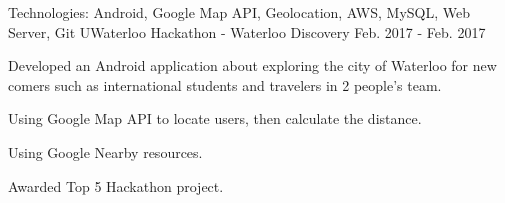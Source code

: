 \begin{cventries}
  \cventry
    {Technologies: \quad Android, Google Map API, Geolocation, AWS, MySQL, Web Server, Git}
    {UWaterloo Hackathon - Waterloo Discovery}
    {}
    {Feb. 2017 - Feb. 2017}
    {
      \begin{cvitems}
        \item {Developed an Android application about exploring the city of Waterloo for new comers such as international students and travelers in 2 people's team.}
        \item {Using Google Map API to locate users, then calculate the distance.}
        \item {Using Google Nearby resources.}
        \item {Awarded Top 5 Hackathon project.}
      \end{cvitems}
    }
    
    
    

\end{cventries}
